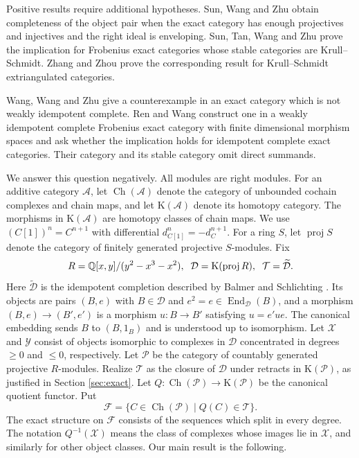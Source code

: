 \documentclass[11pt,a4paper,reqno]{amsart}
\newcommand{\Acal}{\mathcal A}
\newcommand{\Dcal}{\mathcal D}
\newcommand{\Pcal}{\mathcal P}
\newcommand{\Tcal}{\mathcal T}
\newcommand{\Xcal}{\mathcal X}
\newcommand{\proj}{\operatorname{proj}}
\theoremstyle{plain}
\theoremstyle{definition}
\theoremstyle{remark}
\newcommand{\Fcal}{\mathcal F}
\newcommand{\Ycal}{\mathcal Y}
\newcommand{\End}{\operatorname{End}}
\newcommand{\Ch}{\operatorname{Ch}}
\newcommand{\Kcat}{\mathrm K}
\begin{document}
Positive results require additional hypotheses. Sun, Wang and Zhu \cite[Theorem~3.6(2)]{SWZ24} obtain completeness of the object pair when the exact category has enough projectives and injectives and the right ideal is enveloping. Sun, Tan, Wang and Zhu \cite[Corollary~1.3]{STWZ25} prove the implication for Frobenius exact categories whose stable categories are Krull--Schmidt. Zhang and Zhou \cite[Theorem~3.11]{ZZ26} prove the corresponding result for Krull--Schmidt extriangulated categories.

Wang, Wang and Zhu \cite{WWZ26} give a counterexample in an exact category which is not weakly idempotent complete. Ren and Wang \cite[Theorem~1.2 and Question~4.10]{RW26} construct one in a weakly idempotent complete Frobenius exact category with finite dimensional morphism spaces and ask whether the implication holds for idempotent complete exact categories. Their category and its stable category omit direct summands.

We answer this question negatively. All modules are right modules. For an additive category $\Acal$, let $\Ch(\Acal)$ denote the category of unbounded cochain complexes and chain maps, and let $\Kcat(\Acal)$ denote its homotopy category. The morphisms in $\Kcat(\Acal)$ are homotopy classes of chain maps. We use $(C[1])^n=C^{n+1}$ with differential $d_{C[1]}^n=-d_C^{n+1}$. For a ring $S$, let $\proj S$ denote the category of finitely generated projective $S$-modules. Fix
\begin{equation}\label{eq:ring}
R=\mathbb Q[x,y]/(y^2-x^3-x^2),
\hspace{2mm}
\Dcal=\Kcat(\proj R),
\hspace{2mm}
\Tcal=\widetilde{\Dcal}.
\end{equation}
Here $\widetilde{\Dcal}$ is the idempotent completion described by Balmer and Schlichting \cite[Section~1]{BS01}. Its objects are pairs $(B,e)$ with $B\in\Dcal$ and $e^2=e\in\End_{\Dcal}(B)$, and a morphism $(B,e)\to(B',e')$ is a morphism $u:B\to B'$ satisfying $u=e'ue$. The canonical embedding sends $B$ to $(B,1_B)$ and is understood up to isomorphism. Let $\Xcal$ and $\Ycal$ consist of objects isomorphic to complexes in $\Dcal$ concentrated in degrees $\geq0$ and $\leq0$, respectively. Let $\Pcal$ be the category of countably generated projective $R$-modules. Realize $\Tcal$ as the closure of $\Dcal$ under retracts in $\Kcat(\Pcal)$, as justified in Section \ref{sec:exact}. Let $Q:\Ch(\Pcal)\to\Kcat(\Pcal)$ be the canonical quotient functor. Put
$$
\Fcal=\{C\in\Ch(\Pcal)\mid Q(C)\in\Tcal\}.
$$
The exact structure on $\Fcal$ consists of the sequences which split in every degree. The notation $Q^{-1}(\Xcal)$ means the class of complexes whose images lie in $\Xcal$, and similarly for other object classes. Our main result is the following. 
\end{document}
